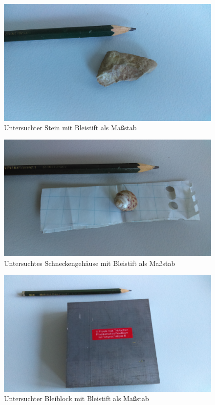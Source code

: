 \documentclass[a4paper,14pt]{article}
\begin{document}
\begin{figure}[H]
\centering
\includegraphics[width=\textwidth]{../Photos/Stein.jpg}
\caption{Untersuchter Stein mit Bleistift als Maßstab}
\label{Stein}
\end{figure}

\begin{figure}[H]
\centering
\includegraphics[width=\textwidth]{../Photos/Schnecke.jpg}
\caption{Untersuchtes Schneckengehäuse mit Bleistift als Maßstab}
\label{Schnecke}
\end{figure}

\begin{figure}[H]
\centering
\includegraphics[width=\textwidth]{../Photos/Blei.jpg}
\caption{Untersuchter Bleiblock mit Bleistift als Maßstab}
\label{Blei}
\end{figure}
\end{document}
